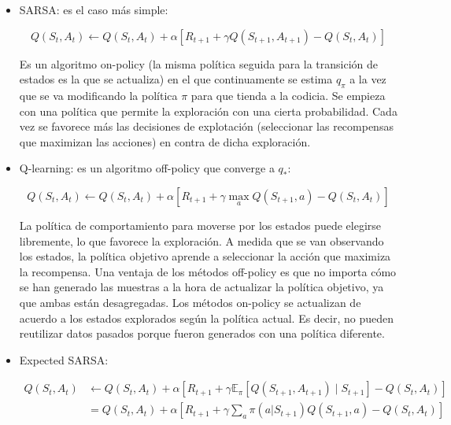\documentclass[11pt,a4paper]{article}
\begin{document}
		\begin{itemize}
			\item SARSA: es el caso más simple:
			
			\begin{equation}
			Q(S_t, A_t) \leftarrow Q(S_t, A_t) + \alpha \left[ R_{t+1} + \gamma Q(S_{t+1}, A_{t+1}) - Q(S_t, A_t) \right]
			\end{equation}
			
			Es un algoritmo on-policy (la misma política seguida para la transición de estados es la que se actualiza) en el que continuamente se estima $q_\pi$ a la vez que se va modificando la política $\pi$ para que tienda a la codicia. Se empieza con una política que permite la exploración con una cierta probabilidad. Cada vez se favorece más las decisiones de explotación (seleccionar las recompensas que maximizan las acciones) en contra de dicha exploración.
			
			\item Q-learning: es un algoritmo off-policy que converge a $q_*$:
			
			\begin{equation}
			Q(S_t, A_t) \leftarrow Q(S_t, A_t) + \alpha \left[ R_{t+1} + \gamma \max_a Q(S_{t+1}, a) - Q(S_t, A_t) \right]
			\end{equation}
			
			La política de comportamiento para moverse por los estados puede elegirse libremente, lo que favorece la exploración. A medida que se van observando los estados, la política objetivo aprende a seleccionar la acción que maximiza la recompensa. Una ventaja de los métodos off-policy es que no importa cómo se han generado las muestras a la hora de actualizar la política objetivo, ya que ambas están desagregadas. Los métodos on-policy se actualizan de acuerdo a los estados explorados según la política actual. Es decir, no pueden reutilizar datos pasados porque fueron generados con una política diferente. 
			
			\item Expected SARSA:
			
			\begin{align}
			Q(S_t, A_t) &\leftarrow Q(S_t, A_t) + \alpha \left[ R_{t+1} + \gamma \mathbb{E}_\pi \left[ Q(S_{t+1}, A_{t+1}) \mid S_{t+1} \right] - Q(S_t, A_t) \right] \nonumber \\
			&= Q(S_t, A_t) + \alpha \left[ R_{t+1} + \gamma \sum_a \pi(a|S_{t+1}) Q(S_{t+1}, a) - Q(S_t, A_t) \right]
			\end{align}
			

\end{itemize}
\end{document}
